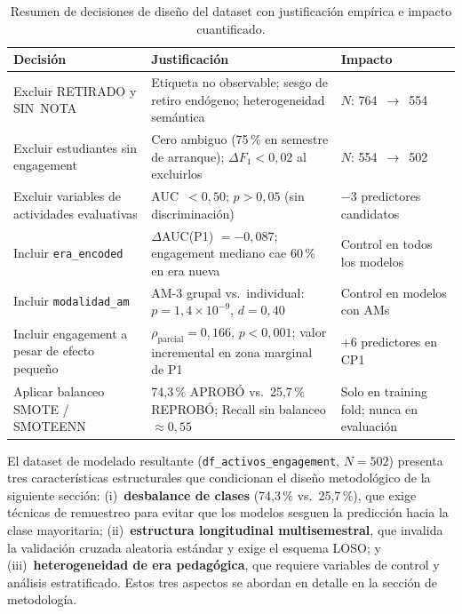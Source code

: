 \begin{table}[htbp]
  \centering
  \caption{Resumen de decisiones de diseño del dataset con
           justificación empírica e impacto cuantificado.}
  \label{tab:resumen_decisiones}
  \small
  \begin{tabular}{p{3.5cm}p{5.0cm}p{4.8cm}}
    \toprule
    \textbf{Decisión} & \textbf{Justificación} & \textbf{Impacto} \\
    \midrule
    Excluir RETIRADO y SIN~NOTA
      & Etiqueta no observable; sesgo de retiro endógeno;
        heterogeneidad semántica
      & $N$: 764~$\to$~554 \\[3pt]
    Excluir estudiantes sin engagement
      & Cero ambiguo (75\,\% en semestre de arranque);
        $\Delta F_1 < 0{,}02$ al excluirlos
      & $N$: 554~$\to$~502 \\[3pt]
    Excluir variables de actividades evaluativas
      & AUC~$< 0{,}50$; $p > 0{,}05$ (sin discriminación)
      & $-3$ predictores candidatos \\[3pt]
    Incluir \texttt{era\_encoded}
      & $\Delta$AUC(P1) $= -0{,}087$;
        engagement mediano cae 60\,\% en era nueva
      & Control en todos los modelos \\[3pt]
    Incluir \texttt{modalidad\_am}
      & AM-3 grupal vs.\ individual:
        $p = 1{,}4\times10^{-9}$, $d = 0{,}40$
      & Control en modelos con AMs \\[3pt]
    Incluir engagement a pesar de efecto pequeño
      & $\rho_{\text{parcial}} = 0{,}166$, $p < 0{,}001$;
        valor incremental en zona marginal de P1
      & $+6$ predictores en CP1 \\[3pt]
    Aplicar balanceo SMOTE / SMOTEENN
      & 74,3\,\% APROBÓ vs.\ 25,7\,\% REPROBÓ;
        Recall sin balanceo $\approx 0{,}55$
      & Solo en training fold; nunca en evaluación \\
    \bottomrule
  \end{tabular}
\end{table}

El dataset de modelado resultante (\texttt{df\_activos\_engagement},
$N = 502$) presenta tres características estructurales que
condicionan el diseño metodológico de la siguiente sección:
(i)~\textbf{desbalance de clases} (74,3\,\% vs.\ 25,7\,\%),
que exige técnicas de remuestreo para evitar que los modelos
sesguen la predicción hacia la clase mayoritaria;
(ii)~\textbf{estructura longitudinal multisemestral}, que
invalida la validación cruzada aleatoria estándar y exige el
esquema LOSO; y (iii)~\textbf{heterogeneidad de era pedagógica},
que requiere variables de control y análisis estratificado.
Estos tres aspectos se abordan en detalle en la sección de
metodología.

